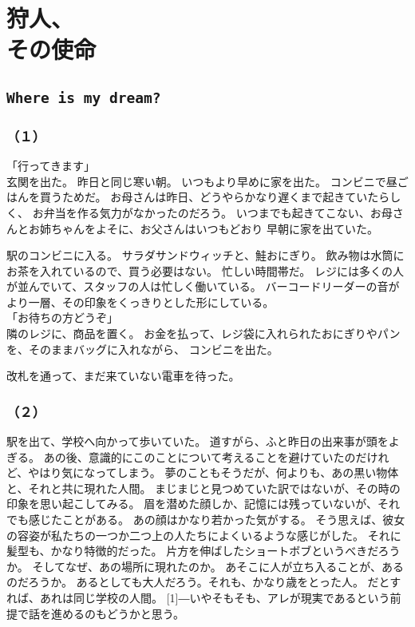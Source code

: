 \documentclass[../IHMain]{subfiles}
\begin{document}
    
\chapter{狩人、\\その使命}
\section{\tt Where is my dream?}
\subsection*{（１）}
「行ってきます」\\
玄関を出た。
昨日と同じ寒い朝。
いつもより早めに家を出た。
コンビニで昼ごはんを買うためだ。
お母さんは昨日、どうやらかなり遅くまで起きていたらしく、
お弁当を作る気力がなかったのだろう。
いつまでも起きてこない、お母さんとお姉ちゃんをよそに、お父さんはいつもどおり
早朝に家を出ていた。

駅のコンビニに入る。
サラダサンドウィッチと、鮭おにぎり。
飲み物は水筒にお茶を入れているので、買う必要はない。
忙しい時間帯だ。
レジには多くの人が並んでいて、スタッフの人は忙しく働いている。
バーコードリーダーの音がより一層、その印象をくっきりとした形にしている。\\
「お待ちの方どうぞ」\\
隣のレジに、商品を置く。
お金を払って、レジ袋に入れられたおにぎりやパンを、そのままバッグに入れながら、
コンビニを出た。

改札を通って、まだ来ていない電車を待った。

\subsection*{（２）}
駅を出て、学校へ向かって歩いていた。
道すがら、ふと昨日の出来事が頭をよぎる。
あの後、意識的にこのことについて考えることを避けていたのだけれど、やはり気になってしまう。
夢のこともそうだが、何よりも、あの黒い物体と、それと共に現れた人間。
まじまじと見つめていた訳ではないが、その時の印象を思い起こしてみる。
眉を潜めた顔しか、記憶には残っていないが、それでも感じたことがある。
あの顔はかなり若かった気がする。
そう思えば、彼女の容姿が私たちの一つか二つ上の人たちによくいるような感じがした。
それに髪型も、かなり特徴的だった。
片方を伸ばしたショートボブというべきだろうか。
そしてなぜ、あの場所に現れたのか。
あそこに人が立ち入ることが、あるのだろうか。
あるとしても大人だろう。それも、かなり歳をとった人。
だとすれば、あれは同じ学校の人間。
\scalebox{3}[1]{―}いやそもそも、アレが現実であるという前提で話を進めるのもどうかと思う。
\end{document}
